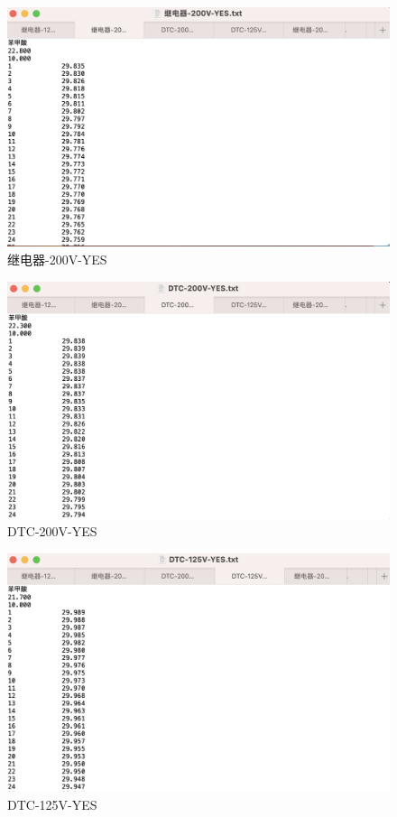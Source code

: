 \documentclass[12pt]{ctexart}
\numberwithin{equation}{section}
\begin{document}
\begin{figure}[ht]
    \centering
    \includegraphics[width=1\textwidth]{2.png}
    \caption{继电器-200V-YES}
\end{figure}

\begin{figure}[ht]
    \centering
    \includegraphics[width=1\textwidth]{3.png}
    \caption{DTC-200V-YES}
\end{figure}

\begin{figure}[ht]
    \centering
    \includegraphics[width=1\textwidth]{4.png}
    \caption{DTC-125V-YES}
\end{figure}
\end{document}
